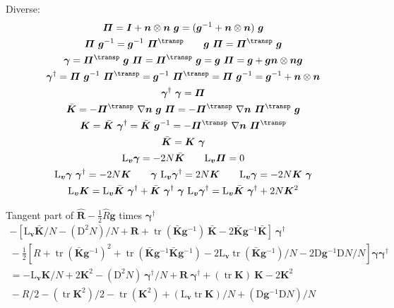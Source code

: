 \documentclass[\ifafour a4paper,12pt,\else a5paper,10pt,\fi%
onecolumn,oneside,article,%
british%
]{memoir}
\theoremstyle{remark}
\theoremstyle{innote}
\newcommand*{\Di}{\mathrm{D}}%
\newcommand*{\Li}{\mathrm{L}}%
\DeclareMathOperator{\tr}{tr}%
\renewcommand*{\|}[1][]{\nonscript\:#1\vert\nonscript\:\mathopen{}}
\newcommand*{\T}{^\transp}%
\newcommand*{\da}{^{\dagger}}
\begin{document}
Diverse:
\begin{gather}
    \bm{\varPi} = \bm{I} + \bm{n}\otimes\bm{n}\ \bm{g}
= (\bm{g}^{-1} + \bm{n}\otimes\bm{n})\ \bm{g}
  \\
  \bm{\varPi}\ \bm{g}^{-1} = \bm{g}^{-1}\ \bm{\varPi}\T \qquad
  \bm{g}\ \bm{\varPi} = \bm{\varPi}\T\ \bm{g}
  \\
    \bm{\gamma} =\bm{\varPi}\T\ \bm{g}\ \bm{\varPi} =
    \bm{\varPi}\T\ \bm{g} =
    \bm{g}\ \bm{\varPi} 
    = \bm{g} + \bm{g}\bm{n}\otimes\bm{n}\bm{g}
  \\
    \bm{\gamma}\da = \bm{\varPi}\ \bm{g}^{-1}\ \bm{\varPi}\T =
    \bm{g}^{-1}\ \bm{\varPi}\T = 
    \bm{\varPi}\ \bm{g}^{-1}
    = \bm{g}^{-1} + \bm{n}\otimes\bm{n}
    \\
    \bm{\gamma}\da\ \bm{\gamma} = \bm{\varPi}
  \\
  \bar{\bm{K}} = -\bm{\varPi}\T\ \nabla\bm{n}\ \bm{g}\ \bm{\varPi} =
  -\bm{\varPi}\T\ \nabla\bm{n}\ \bm{\varPi}\T\ \bm{g}
  \\
    \bm{K} = \bar{\bm{K}}\ \bm{\gamma}\da  = \bar{\bm{K}}\ \bm{g}^{-1}
    =-\bm{\varPi}\T\ \nabla\bm{n}\ \bm{\varPi}\T
    \\
    \bar{\bm{K}} = \bm{K}\ \bm{\gamma}
    \\
  \Li_{\bm{v}}\bm{\gamma} = -2N\bar{\bm{K}} \qquad
  \Li_{\bm{v}}\bm{\varPi} = 0
  \\
  \Li_{\bm{v}}\bm{\gamma}\ \bm{\gamma}\da  = -2N\bm{K} \qquad 
  \bm{\gamma}\ \Li_{\bm{v}}\bm{\gamma}\da= 2N\bm{K} \qquad
  \Li_{\bm{v}}\bm{\gamma} = -2N\bm{K}\ \bm{\gamma}
  \\
  \Li_{\bm{v}}\bm{K} =
  \Li_{\bm{v}}\bar{\bm{K}}\ \bm{\gamma}\da +
  \bar{\bm{K}}\ \bm{\gamma}\da\ \bm{\gamma}\ \Li_{\bm{v}}\bm{\gamma}\da
  = \Li_{\bm{v}}\bar{\bm{K}}\ \bm{\gamma}\da + 2N\bm{K}^{2}
\end{gather}

Tangent part of $\hat{\bm{R}}-\frac{1}{2}\hat{R}\bm{g}$ times $\bm{\gamma}\da$
\begin{multline}
  \label{eq:tangent31}
  -[\Li_{\bm{v}}\bar{\bm{K}}/N - (\Di^{2}N)/N + \bm{R}
  + \tr(\bar{\bm{K}}\bm{g}^{-1})\ \bar{\bm{K}}
  - 2 \bar{\bm{K}}\bm{g}^{-1}\bar{\bm{K}}]\ \bm{\gamma}\da\\
  {}-\frac{1}{2}
  [R + \tr(\bar{\bm{K}}\bm{g}^{-1})^{2}
  +\tr(\bar{\bm{K}} \bm{g}^{-1}\bar{\bm{K}} \bm{g}^{-1})
  -2\Li_{\bm{v}}\tr(\bar{\bm{K}}\bm{g}^{-1})/N
  -2\Di\bm{g}^{-1}\Di N /N] \bm{\gamma}\bm{\gamma}\da
  \\
  {}=
  -\Li_{\bm{v}}\bm{K}/N + 2\bm{K}^{2} - (\Di^{2}N)\ \bm{\gamma}\da/N
  + \bm{R}\ \bm{\gamma}\da + (\tr\bm{K})\ \bm{K} - 2\bm{K}^{2}\\
  {}-R/2 - (\tr\bm{K}^{2})/2 - \tr(\bm{K}^{2})
  + (\Li_{\bm{v}}\tr\bm{K})/N + (\Di\bm{g}^{-1}\Di N)/N
\end{multline}
\end{document}
